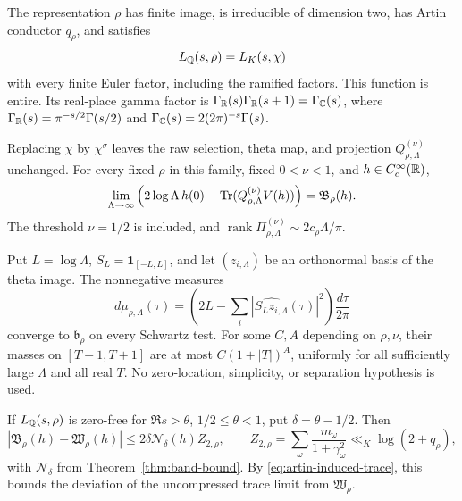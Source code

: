 \begin{corollary}
\label{cor:artin-induced-cutoff}
The representation $\rho$ has finite image, is irreducible of
dimension two, has Artin conductor $q_\rho$, and satisfies
\begin{equation}\label{eq:artin-induced-L}
                   L_\mathbb Q(s,\rho)=L_K(s,\chi)
\end{equation}
with every finite Euler factor, including the ramified factors.
This function is entire. Its real-place gamma factor is
$\Gamma_\mathbb R(s)\Gamma_\mathbb R(s+1)=\Gamma_\mathbb C(s)$, where
$\Gamma_\mathbb R(s)=\pi^{-s/2}\Gamma(s/2)$ and
$\Gamma_\mathbb C(s)=2(2\pi)^{-s}\Gamma(s)$.

Replacing $\chi$ by $\chi^\sigma$ leaves the raw selection,
theta map, and projection $Q_{\rho,\Lambda}^{(\nu)}$ unchanged.
For every fixed $\rho$ in this family, fixed $0<\nu<1$, and
$h\in C_c^\infty(\mathbb R)$,
\begin{equation}\label{eq:artin-induced-trace}
 \lim_{\Lambda\to\infty}
 \left(2\log\Lambda\,h(0)
      -\operatorname{Tr}(Q_{\rho,\Lambda}^{(\nu)}V(h))\right)
                         =\mathfrak B_\rho(h).
\end{equation}
The threshold $\nu=1/2$ is included, and
$\operatorname{rank}\Pi_{\rho,\Lambda}^{(\nu)}
\sim2c_\rho\Lambda/\pi$.

Put $L=\log\Lambda$, $S_L=\mathbf1_{[-L,L]}$, and let
$(z_{i,\Lambda})$ be an orthonormal basis of the theta image.
The nonnegative measures
\begin{equation}\label{eq:artin-induced-measures}
 d\mu_{\rho,\Lambda}(\tau)=
 \left(2L-\sum_i|\widehat{S_Lz_{i,\Lambda}}(\tau)|^2\right)
                                      \frac{d\tau}{2\pi}
\end{equation}
converge to $\mathfrak b_\rho$ on every Schwartz test.
For some $C,A$ depending on $\rho,\nu$, their masses on
$[T-1,T+1]$ are at most $C(1+|T|)^A$, uniformly for all
sufficiently large $\Lambda$ and all real $T$.
No zero-location, simplicity, or separation hypothesis is used.

If $L_\mathbb Q(s,\rho)$ is zero-free for $\Re s>\theta$,
$1/2\leq\theta<1$, put $\delta=\theta-1/2$. Then
\begin{equation}\label{eq:artin-induced-band}
 |\mathfrak B_\rho(h)-\mathfrak W_\rho(h)|
       \leq2\delta\mathcal N_\delta(h)Z_{2,\rho},
 \qquad
 Z_{2,\rho}=\sum_\omega\frac{m_\omega}{1+\gamma_\omega^2}
                  \ll_K\log(2+q_\rho),
\end{equation}
with $\mathcal N_\delta$ from Theorem~\ref{thm:band-bound}.
By \eqref{eq:artin-induced-trace}, this bounds the deviation of
the uncompressed trace limit from $\mathfrak W_\rho$.
\end{corollary}

